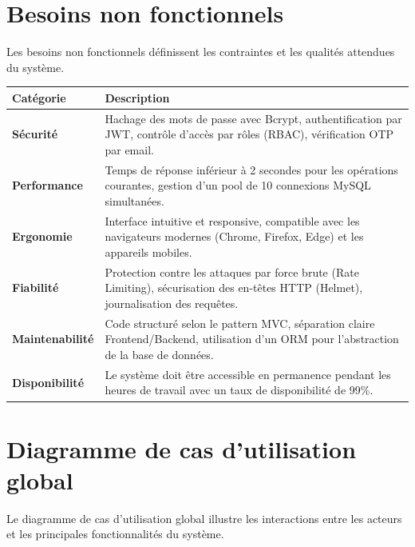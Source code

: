 \section{Besoins non fonctionnels}
Les besoins non fonctionnels définissent les contraintes et les qualités attendues du système.

\begin{center}
\begin{tabular}{|l|p{10cm}|}
\hline
\textbf{Catégorie} & \textbf{Description} \\ \hline
\textbf{Sécurité} & Hachage des mots de passe avec Bcrypt, authentification par JWT, contrôle d'accès par rôles (RBAC), vérification OTP par email. \\ \hline
\textbf{Performance} & Temps de réponse inférieur à 2 secondes pour les opérations courantes, gestion d'un pool de 10 connexions MySQL simultanées. \\ \hline
\textbf{Ergonomie} & Interface intuitive et responsive, compatible avec les navigateurs modernes (Chrome, Firefox, Edge) et les appareils mobiles. \\ \hline
\textbf{Fiabilité} & Protection contre les attaques par force brute (Rate Limiting), sécurisation des en-têtes HTTP (Helmet), journalisation des requêtes. \\ \hline
\textbf{Maintenabilité} & Code structuré selon le pattern MVC, séparation claire Frontend/Backend, utilisation d'un ORM pour l'abstraction de la base de données. \\ \hline
\textbf{Disponibilité} & Le système doit être accessible en permanence pendant les heures de travail avec un taux de disponibilité de 99\%. \\ \hline
\end{tabular}
\end{center}


\section{Diagramme de cas d'utilisation global}
Le diagramme de cas d'utilisation global illustre les interactions entre les acteurs et les principales fonctionnalités du système.

